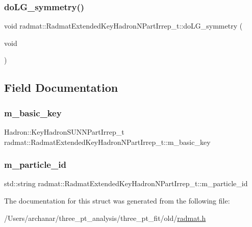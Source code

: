 \subsubsection{\texorpdfstring{doLG\_symmetry()}{doLG\_symmetry()}}
{\footnotesize\ttfamily void radmat\+::\+Radmat\+Extended\+Key\+Hadron\+N\+Part\+Irrep\+\_\+t\+::do\+L\+G\+\_\+symmetry (\begin{DoxyParamCaption}\item[{void}]{ }\end{DoxyParamCaption})\hspace{0.3cm}{\ttfamily [inline]}}



\subsection{Field Documentation}
\mbox{\label{structradmat_1_1RadmatExtendedKeyHadronNPartIrrep__t_a87946ef409921c2b08548d9f8ec3e89a}} 
\subsubsection{\texorpdfstring{m\_basic\_key}{m\_basic\_key}}
{\footnotesize\ttfamily Hadron\+::\+Key\+Hadron\+S\+U\+N\+N\+Part\+Irrep\+\_\+t radmat\+::\+Radmat\+Extended\+Key\+Hadron\+N\+Part\+Irrep\+\_\+t\+::m\+\_\+basic\+\_\+key}

\mbox{\label{structradmat_1_1RadmatExtendedKeyHadronNPartIrrep__t_ad3d2dc1dd2234335c468e32c4b3eeb85}} 
\subsubsection{\texorpdfstring{m\_particle\_id}{m\_particle\_id}}
{\footnotesize\ttfamily std\+::string radmat\+::\+Radmat\+Extended\+Key\+Hadron\+N\+Part\+Irrep\+\_\+t\+::m\+\_\+particle\+\_\+id}



The documentation for this struct was generated from the following file\+:\begin{DoxyCompactItemize}
\item 
/\+Users/archanar/three\+\_\+pt\+\_\+analysis/three\+\_\+pt\+\_\+fit/old/\mbox{\hyperlink{radmat_8h}{radmat.\+h}}\end{DoxyCompactItemize}
